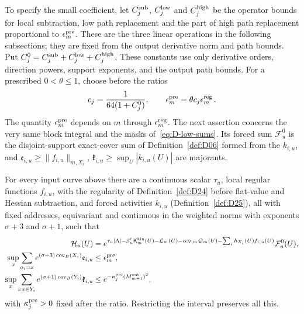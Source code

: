 To specify the small coefficient, let $C_j^{\rm sub}$, $C_j^{\rm low}$ and $C_j^{\rm high}$ be the operator bounds for local subtraction, low path replacement and the part of high path replacement proportional to $\epsilon^{\rm pre}_m$. These are the three linear operations in the following subsections; they are fixed from the output derivative norm and path bounds. Put $C_j^0=C_j^{\rm sub}+C_j^{\rm low}+C_j^{\rm high}$. These constants use only derivative orders, direction powers, support exponents, and the output path bounds. For a prescribed $0<\theta\le1$, choose before the ratios
\begin{equation*}
c_j=\frac1{64(1+C_j^0)},\qquad \epsilon^{\rm pre}_m=\theta c_j\epsilon_m^{\rm reg}\,.
\end{equation*}
The quantity $\epsilon^{\rm pre}_m$ depends on $m$ through $\epsilon_m^{\rm reg}$. The next assertion concerns the very same block integral and the masks of~\eqref{eq:D-low-sums}. Its forced sum $\mathcal F_u^0$ is the disjoint-support exact-cover sum of Definition~\ref{def:D06} formed from the $k_{i,u}$, and $\mathfrak e_{i,u}\ge\|f_{i,u}\|_{m,X_i}$, $\mathfrak k_{i,u}\ge\sup_U|k_{i,u}(U)|$ are majorants.
\begin{lemma}\label{lem:D-preliminary}
For every input curve above there are a continuous scalar $\tau_u$, local regular functions $f_{i,u}$, with the regularity of Definition~\ref{def:D24} before flat-value and Hessian subtraction, and forced activities $k_{i,u}$ (Definition~\ref{def:D25}), all with fixed addresses, equivariant and continuous in the weighted norms with exponents $\sigma+3$ and $\sigma+1$, such that
\begin{align}\label{eq:D-early}
\mathcal H_u(U)&=e^{\tau_u|\Lambda|-\beta'_u\mathsf K_m^{\rm kin}(U)-\mathcal L_m(U)
-\alpha_{N,m}\mathcal Q_m(U)-\sum_i h_{X_i}(U)f_{i,u}(U)}\mathcal F_u^0(U),\\
\sup_x\sum_{o_i=x}e^{(\sigma+3)\operatorname{cov}_B(X_i)}\mathfrak e_{i,u}&\le\epsilon^{\rm pre}_m,\label{eq:D-early-bound}\\
\sup_x\sum_{i:x\in Y_i}e^{(\sigma+1)\operatorname{cov}_B(Y_i)}\mathfrak k_{i,u}&\le e^{-\kappa_j^{\rm pre}(M^{\mathrm{cut}}_{m+1})^2},
\label{eq:D-preliminary-forced}
\end{align}
with $\kappa_j^{\rm pre}>0$ fixed after the ratio. Restricting the interval preserves all this.
\end{lemma}
